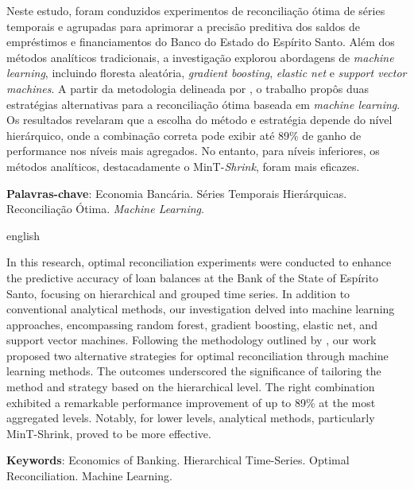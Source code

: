 \documentclass[
  12pt,
  twoside,
  openright,
  a4paper,
  chapter=TITLE,
  section=TITLE,
  brazil]{abntex2}
\begin{document}


\setlength{\absparsep}{18pt}
\begin{resumo}
  Neste estudo, foram conduzidos experimentos de reconciliação ótima de séries temporais e agrupadas para aprimorar a precisão preditiva dos saldos de empréstimos e financiamentos do Banco do Estado do Espírito Santo. Além dos métodos analíticos tradicionais, a investigação explorou abordagens de \textit{machine learning}, incluindo floresta aleatória, \textit{gradient boosting}, \textit{elastic net} e \textit{support vector machines}. A partir da metodologia delineada por \textcite{spiliotis_hierarchical_2021}, o trabalho propôs duas estratégias alternativas para a reconciliação ótima baseada em \textit{machine learning}. Os resultados revelaram que a escolha do método e estratégia depende do nível hierárquico, onde a combinação correta pode exibir até 89\% de ganho de performance nos níveis mais agregados. No entanto, para níveis inferiores, os métodos analíticos, destacadamente o MinT-\textit{Shrink}, foram mais eficazes.

  \textbf{Palavras-chave}: Economia Bancária. Séries Temporais Hierárquicas. Reconciliação Ótima. \textit{Machine Learning}.
\end{resumo}

\begin{resumo}[Abstract]
  \begin{otherlanguage*}{english}
    
In this research, optimal reconciliation experiments were conducted to enhance the predictive accuracy of loan balances at the Bank of the State of Espírito Santo, focusing on hierarchical and grouped time series. In addition to conventional analytical methods, our investigation delved into machine learning approaches, encompassing random forest, gradient boosting, elastic net, and support vector machines. Following the methodology outlined by \textcite{spiliotis_hierarchical_2021}, our work proposed two alternative strategies for optimal reconciliation through machine learning methods. The outcomes underscored the significance of tailoring the method and strategy based on the hierarchical level. The right combination exhibited a remarkable performance improvement of up to 89\% at the most aggregated levels. Notably, for lower levels, analytical methods, particularly MinT-Shrink, proved to be more effective.
    \vspace{\onelineskip}
 
    \noindent 
    \textbf{Keywords}: Economics of Banking. Hierarchical Time-Series. Optimal Reconciliation. Machine Learning.
  \end{otherlanguage*}
\end{resumo}
\end{document}
